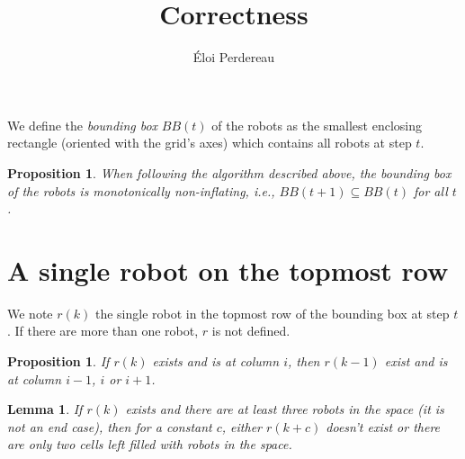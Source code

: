 \documentclass[11pt, a4paper]{article}
\title{Correctness}
\author{\'Eloi Perdereau}
\theoremstyle{plain}
\newtheorem{lem}[thm]{Lemma}
\newtheorem{prop}[thm]{Proposition}
\theoremstyle{definition}
\theoremstyle{remark}
\begin{document}
\maketitle

We define the \textit{bounding box} $BB(t)$ of the robots as the smallest
enclosing rectangle (oriented with the grid's axes) which contains all robots
at step $t$.

\begin{prop}
When following the algorithm described above, the bounding box of the robots is
monotonically non-inflating, i.e., $BB(t+1) \subseteq BB(t)$ for all $t$.
\end{prop}

\section{A single robot on the topmost row}

We note $r(k)$ the single robot in the topmost row of the bounding box at step
$t$. If there are more than one robot, $r$ is not defined.

\begin{prop}
If $r(k)$ exists and is at column $i$, then $r(k-1)$ exist and is at column
$i-1$, $i$ or $i+1$.
\end{prop}

\begin{lem}
If $r(k)$ exists and there are at least three robots in the space (it is not an
end case), then for a constant $c$, either $r(k+c)$ doesn't exist or there are
only two cells left filled with robots in the space.
\end{lem}
\end{document}
